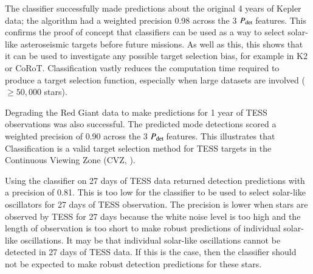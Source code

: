 \documentclass[a4paper,fleqn,usenatbib,useAMS]{mnras}
\newcommand{\kep}{\ensuremath{Kepler}\:}
\newcommand{\pdet}{\ensuremath{P_{\rm det}\:}}
\begin{document}
The classifier successfully made predictions about the original 4 years of Kepler data; the algorithm had a weighted precision 0.98 across the 3 \pdet features. This confirms the proof of concept that classifiers can be used as a way to select solar-like asteroseismic targets before future missions. As well as this, this shows that it can be used to investigate any possible target selection bias, for example in K2 or CoRoT. Classification vastly reduces the computation time required to produce a target selection function, especially when large datasets are involved ($\geq50,000$ stars).  

Degrading the Red Giant data to make predictions for 1 year of TESS observations was also successful. The predicted mode detections scored a weighted precision of 0.90 across the 3 \pdet features. This illustrates that Classification is a valid target selection method for TESS targets in the Continuous Viewing Zone (CVZ, \citep{ricker_transiting_2014}).

Using the classifier on 27 days of TESS data returned detection predictions with a precision of 0.81. This is too low for the classifier to be used to select solar-like oscillators for 27 days of TESS observation. The precision is lower when stars are observed by TESS for 27 days because the white noise level is too high and the length of observation is too short to make robust predictions of individual solar-like oscillations. It may be that individual solar-like oscillations cannot be detected in 27 days of TESS data. If this is the case, then the classifier should not be expected to make robust detection predictions for these stars.









\bsp
\label{lastpage}
\end{document}
